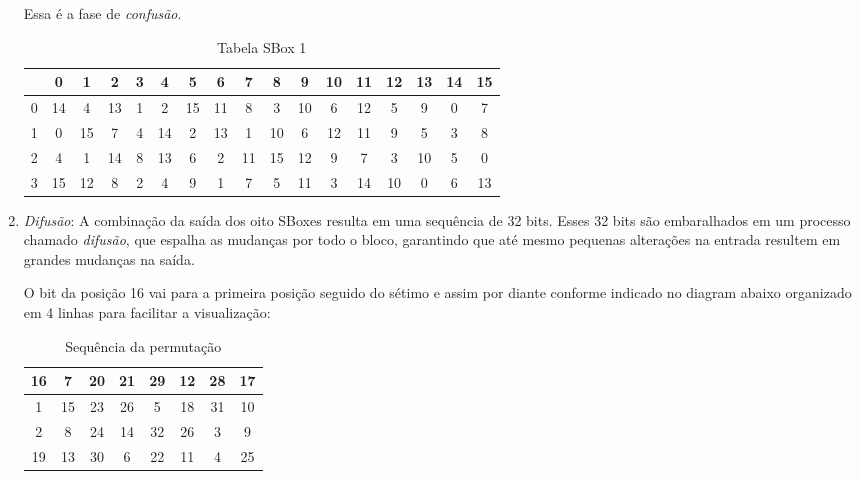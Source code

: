 \begin{enumerate}
      Essa é a fase de \textit{confusão}.

\begin{table}[h!]
  \label{tab:s1}
  \small %
\centering
\begin{tabular}{|c|cccccccccccccccc| }
\hline
  & 0  & 1  & 2  & 3 & 4  & 5  & 6  & 7  & 8  & 9  & 10 & 11 & 12 & 13 & 14 & 15 \\
\hline
0 & 14 & 4  & 13 & 1 & 2  & 15 & 11 & 8  & 3  & 10 & 6  & 12 & 5  & 9  & 0  & 7  \\
1 & 0  & 15 & 7  & 4 & 14 & 2  & 13 & 1  & 10 & 6  & 12 & 11 & 9  & 5  & 3  & 8  \\
2 & 4  & 1  & 14 & 8 & 13 & 6  & 2  & 11 & 15 & 12 & 9  & 7  & 3  & 10 & 5  & 0  \\
3 & 15 & 12 & 8  & 2 & 4  & 9  & 1  & 7  & 5  & 11 & 3  & 14 & 10 & 0  & 6  & 13 \\
\hline
\end{tabular}
\caption{Tabela SBox 1}
\end{table}

      
    \item {\em Difusão}:
      A combinação da saída dos oito SBoxes resulta em uma sequência de 32 bits.
      Esses 32 bits são embaralhados em um processo chamado \textit{difusão}, que espalha as mudanças por todo o bloco, garantindo que até mesmo pequenas alterações na entrada resultem em grandes mudanças na saída.

      O bit da posição 16 vai para a primeira posição seguido do sétimo e assim por diante conforme indicado no diagram abaixo organizado em 4 linhas para facilitar a visualização:

\begin{table}[h!]
\centering
\begin{tabular}{|*{8}{c|}}
\hline
16 & 7  & 20 & 21 & 29 & 12 & 28 & 17 \\
\hline
1  & 15 & 23 & 26 & 5  & 18 & 31 & 10 \\
\hline
2  & 8  & 24 & 14 & 32 & 26 & 3  & 9  \\
\hline
19 & 13 & 30 & 6  & 22 & 11 & 4  & 25 \\
\hline
\end{tabular}
\caption{Sequência da permutação}
\end{table}
      
      
\end{enumerate}




